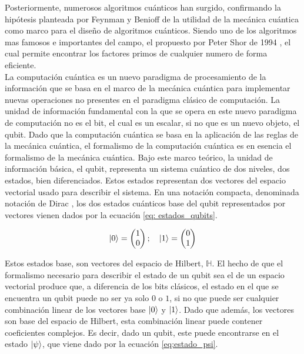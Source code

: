 Posteriormente, numerosos algoritmos cuánticos han surgido, confirmando la hipótesis planteada por Feynman y Benioff de la utilidad de la mecánica cuántica como marco para el diseño de algoritmos cuánticos. Siendo uno de los algoritmos mas famosos e importantes del campo, el propuesto por Peter Shor de 1994 \citep{shor}, el cual permite encontrar los factores primos de cualquier numero de forma eficiente. \\

La computación cuántica es un nuevo paradigma de procesamiento de la información que se basa en el marco de la mecánica cuántica para implementar nuevas operaciones no presentes en el paradigma clásico de computación. La unidad de información fundamental con la que se opera en este nuevo paradigma de computación no es el bit, el cual es un escalar, si no que es un nuevo objeto, el qubit. Dado que la computación cuántica se basa en la aplicación de las reglas de la mecánica cuántica, el formalismo de la computación cuántica es en esencia el formalismo de la mecánica cuántica. Bajo este marco teórico, la unidad de información básica, el qubit, representa un sistema cuántico de dos niveles, dos estados, bien diferenciados. Estos estados representan dos vectores del espacio vectorial usado para describir el sistema. En una notación compacta, denominada notación de Dirac \citep{dirac1939}, los dos estados cuánticos base del qubit representados por vectores vienen dados por la ecuación  \ref{eq: estados_qubits}.  


\begin{equation}
    \ket{0} = 
    \begin{pmatrix}
        1 \\
        0
    \end{pmatrix}
    ;
    \quad
    \ket{1} = 
    \begin{pmatrix}
        0 \\
        1
    \end{pmatrix}
    \label{eq: estados_qubits}
\end{equation}


Estos estados base, son vectores del espacio de Hilbert, $\mathbb{H}$. El hecho de que el formalismo necesario para describir el estado de un qubit sea el de un espacio vectorial produce que, a diferencia de los bits clásicos, el estado en el que se encuentra un qubit puede no ser ya solo $0$ o $1$, si no que puede ser cualquier combinación linear de los vectores base $\ket{0}$ y $\ket{1}$. Dado que además, los vectores son base del espacio de Hilbert, esta combinación linear puede contener coeficientes complejos. Es decir, dado un qubit, este puede encontrarse en el estado $\ket{\psi}$, que viene dado por la ecuación \ref{eq:estado_psi}.

